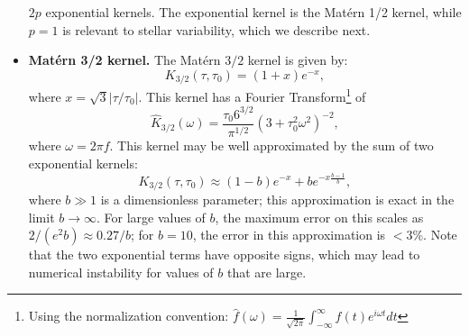 \documentclass[manuscript, letterpaper]{aastex6}
\begin{document}
\begin{itemize}
$2p$ exponential kernels.  The exponential kernel is the Mat\'ern 1/2 kernel, while
$p=1$ is relevant to stellar variability, which we describe next.
\item {\bf Mat\'ern 3/2 kernel.}  The Mat\'ern $3/2$ kernel is given by: 
\begin{equation}
K_{3/2}(\tau,\tau_0) = (1+x)e^{-x},
\end{equation} 
where $x = \sqrt{3}\vert \tau/\tau_0\vert$.  This kernel has a Fourier Transform\footnote{Using the normalization convention: 
$\hat f(\omega) = \frac{1}{\sqrt{2\pi}} \int_{-\infty}^\infty f(t) e^{i\omega t} dt$}  of
\begin{equation}
\hat K_{3/2}(\omega) = \frac{\tau_0 6^{3/2}}{\pi^{1/2}} (3+\tau_0^2\omega^2)^{-2},
\end{equation}
where $\omega = 2\pi f$.  This kernel may be well approximated by the sum of two exponential kernels: 
\begin{equation}
K_{3/2}(\tau,\tau_0) \approx (1-b)e^{-x}+be^{-x\frac{b-1}{b}},
\end{equation} 
where $b \gg 1$ is a dimensionless parameter; this approximation is exact in the limit $b \rightarrow \infty$.  For
large values of $b$, the maximum error on this scales as $2/(e^2b) \approx 0.27/b$; for
$b=10$, the error in this approximation is $<3$\%.  Note that the two exponential terms
have opposite signs, which may lead to numerical instability for values of $b$ that
are large.  


\end{itemize}
\end{document}
